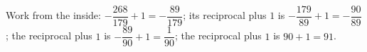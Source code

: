 Work from the inside: $-\dfrac{268}{179}+1=-\dfrac{89}{179}$; its reciprocal plus $1$ is $-\dfrac{179}{89}+1=-\dfrac{90}{89}$; the reciprocal plus $1$ is $-\dfrac{89}{90}+1=\dfrac1{90}$; the reciprocal plus $1$ is $90+1=\boxed{91}$.
